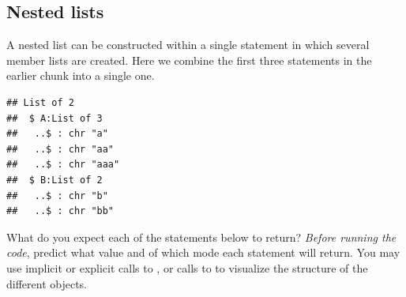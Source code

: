 \documentclass[krantz2]{krantz}\usepackage{knitr}
\begin{document}
\subsection{Nested lists}
A nested list can be constructed within a single statement in which several member lists are created. Here we combine the first three statements in the earlier chunk into a single one.

\begin{knitrout}\footnotesize
{}\color{fgcolor}\begin{kframe}
\begin{alltt}
 \hlkwb{<-} \hlstd{(} \hlstd{=} \hlstd{(}\hlstd{,} \hlstd{,} \hlstd{),}  \hlstd{=} \hlstd{(}\hlstd{,} \hlstd{))}
\end{alltt}
\begin{verbatim}
## List of 2
##  $ A:List of 3
##   ..$ : chr "a"
##   ..$ : chr "aa"
##   ..$ : chr "aaa"
##  $ B:List of 2
##   ..$ : chr "b"
##   ..$ : chr "bb"
\end{verbatim}
\end{kframe}
\end{knitrout}

\begin{playground}
What do you expect each of the statements below to return? \emph{Before running the code}, predict what value and of which mode each statement will return. You may use implicit or explicit calls to , or calls to  to visualize the structure of the different objects.

\begin{knitrout}\footnotesize
{}\color{fgcolor}\begin{kframe}
\begin{alltt}
 \hlkwb{<-} \hlstd{(} \hlstd{=} \hlstd{(}\hlstd{,} \hlstd{,} \hlstd{),}  \hlstd{=} \hlstd{(}\hlstd{,} \hlstd{))}
\hlstd{nested.list[}\hlopt{:}\hlstd{]}
\hlstd{nested.list[}\hlstd{]}
\hlstd{nested.list[[}\hlstd{]][}\hlstd{]}
\hlstd{nested.list[[}\hlstd{]][[}\hlstd{]]}
\hlstd{nested.list[}\hlstd{]}
\hlstd{nested.list[}\hlstd{][[}\hlstd{]]}
\end{alltt}
\end{kframe}
\end{knitrout}

\end{playground}
\end{document}
